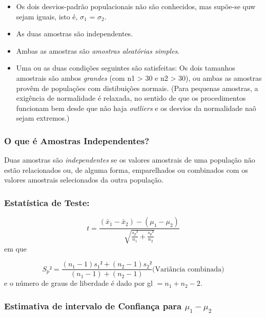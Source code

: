 \documentclass[]{article}
\providecommand{\tightlist}{%
  \setlength{\itemsep}{0pt}\setlength{\parskip}{0pt}}
\begin{document}
\begin{itemize}
\tightlist
\item
  Os dois desvios-padrão populacionais não são conhecidos, mas supõe-se
  quw sejam iguais, isto é, \(\sigma_{1}\) = \(\sigma_{2}\).
\item
  As duas amostras são independentes.
\item
  Ambas as amostras são \emph{amostras aleatórias simples}.
\item
  Uma ou as duas condições seguintes são satisfeitas: Os dois tamanhos
  amostrais são ambos \emph{grandes} (com n1 \textgreater{} 30 e n2
  \textgreater{} 30), ou ambas as amostras provêm de populações com
  distibuições normais. (Para pequenas amostras, a exigência de
  normalidade é relaxada, no sentido de que os procedimentos funcionam
  bem desde que não haja \emph{outliers} e os desvios da normalidade naõ
  sejam extremos.)
\end{itemize}

\hypertarget{o-que-e-amostras-independentes}{%
\subsubsection{O que é Amostras
Independentes?}\label{o-que-e-amostras-independentes}}

Duas amostras são \emph{independentes} se os valores amostrais de uma
população não estão relacionados ou, de alguma forma, emparelhados ou
combinados com os valores amostrais selecionados da outra população.

\hypertarget{estatistica-de-teste}{%
\subsubsection{Estatística de Teste:}\label{estatistica-de-teste}}

\[
t = \frac{(\bar{x}_1 - \bar{x}_2) - (\mu_1 - \mu_2)}{\sqrt{\frac{s_p²}{n_1} + \frac{s_p²}{n_2}}}
\] em que

\[
S_p² = \frac{(n_1 - 1)s_1² + (n_2 - 1)s_2²}{(n_1 - 1) + (n_2 - 1)}  \textrm{(Variância combinada)}
\] e o número de graus de liberdade é dado por gl \(= n_1 + n_2 - 2\).

\hypertarget{estimativa-de-intervalo-de-confianca-para-mu_1---mu_2}{%
\subsubsection{\texorpdfstring{Estimativa de intervalo de Confiança para
\(\mu_1 - \mu_2\)}{Estimativa de intervalo de Confiança para \textbackslash{}mu\_1 - \textbackslash{}mu\_2}}\label{estimativa-de-intervalo-de-confianca-para-mu_1---mu_2}}
\end{document}
